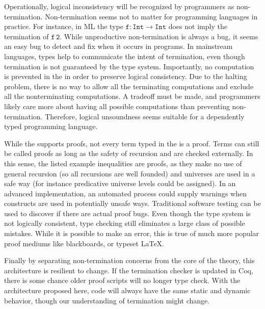 Operationally, logical inconsistency will be recognized by programmers as non-termination.
Non-termination seems not to matter for programming languages in practice.
For instance, in ML the type $\mathtt{f:Int} \rightarrow \mathtt{Int}$ does not imply the termination of $\mathtt{f\,2}$.
While unproductive non-termination is always a bug, it seems an easy bug to detect and fix when it occurs in programs.
In mainstream languages, types help to communicate the intent of termination, even though termination is not guaranteed by the type system.
Importantly, no computation is prevented in the \slang{} in order to preserve logical consistency.
Due to the halting problem, there is no way to allow all the terminating computations and exclude all the nonterminating computations.
A tradeoff must be made, and programmers likely care more about having all possible computations than preventing non-termination.
Therefore, logical unsoundness seems suitable for a dependently typed programming language.
 
 
 
While the \slang{} supports proofs, not every term typed in the \slang{} is a proof.
Terms can still be called proofs as long as the safety of recursion and \tit{} are checked externally.
In this sense, the listed example inequalities are proofs, as they make no use of general recursion (so all recursions are well founded) and universes are used in a safe way (for instance predicative universe levels could be assigned).
In an advanced implementation, an automated process could supply warnings when constructs are used in potentially unsafe ways.
Traditional software testing can be used to discover if there are actual proof bugs.
Even though the type system is not logically consistent, type checking still eliminates a large class of possible mistakes.
While it is possible to make an error, this is true of much more popular proof mediums like blackboards, or typeset \LaTeX.
 
Finally by separating non-termination concerns from the core of the theory, this architecture is resilient to change.
If the termination checker is updated in Coq, there is some chance older proof scripts will no longer type check.
With the architecture proposed here, code will always have the same static and dynamic behavior, though our understanding of termination might change.
 
